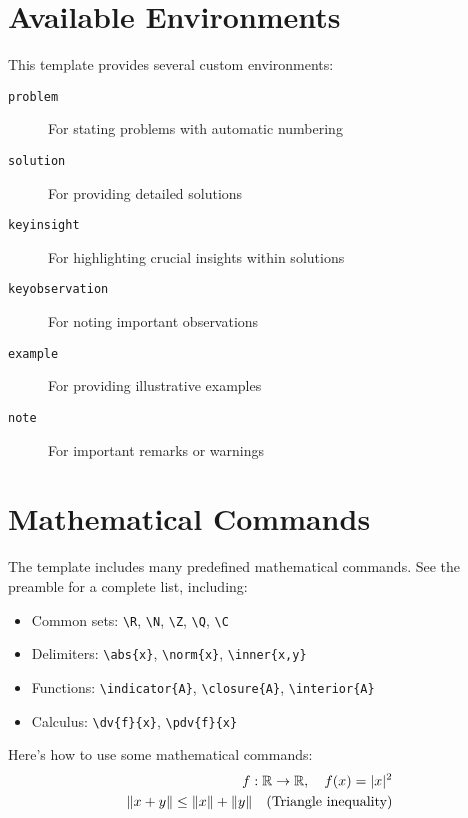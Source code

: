 \documentclass[11pt, oneside, openany]{book}
\theoremstyle{definition}
\newcommand{\R}{\mathbb{R}}          %
\newcommand{\N}{\mathbb{N}}          %
\newcommand{\Z}{\mathbb{Z}}          %
\newcommand{\Q}{\mathbb{Q}}          %
\newcommand{\C}{\mathbb{C}}          %
\DeclarePairedDelimiter{\abs}{\lvert}{\rvert}
\DeclarePairedDelimiter{\norm}{\lVert}{\rVert}
\DeclarePairedDelimiter{\inner}{\langle}{\rangle}    %
\newcommand{\indicator}[1]{\mathbf{1}_{#1}}          %
\newcommand{\closure}[1]{\overline{#1}}              %
\newcommand{\interior}[1]{\overset{\circ}{#1}}       %
\newcommand{\dd}{\mathrm{d}}                          %
\newcommand{\dv}[2]{\frac{\dd #1}{\dd #2}}          %
\newcommand{\pdv}[2]{\frac{\partial #1}{\partial #2}} %
\begin{document}
\section*{Available Environments}

This template provides several custom environments:

\begin{description}
    \item[\texttt{problem}] For stating problems with automatic numbering
    \item[\texttt{solution}] For providing detailed solutions
    \item[\texttt{keyinsight}] For highlighting crucial insights within solutions
    \item[\texttt{keyobservation}] For noting important observations
    \item[\texttt{example}] For providing illustrative examples
    \item[\texttt{note}] For important remarks or warnings
\end{description}

\section*{Mathematical Commands}

The template includes many predefined mathematical commands. See the preamble for a complete list, including:

\begin{itemize}
    \item Common sets: \verb|\R|, \verb|\N|, \verb|\Z|, \verb|\Q|, \verb|\C|
    \item Delimiters: \verb|\abs{x}|, \verb|\norm{x}|, \verb|\inner{x,y}|
    \item Functions: \verb|\indicator{A}|, \verb|\closure{A}|, \verb|\interior{A}|
    \item Calculus: \verb|\dv{f}{x}|, \verb|\pdv{f}{x}|
\end{itemize}

\begin{example}
Here's how to use some mathematical commands:
\begin{align}
    f: \R \to \R, \quad f(x) = \abs{x}^2 \\
    \norm{x + y} \leq \norm{x} + \norm{y} \quad \text{(Triangle inequality)}
\end{align}
\end{example}

\newpage
\end{document}
